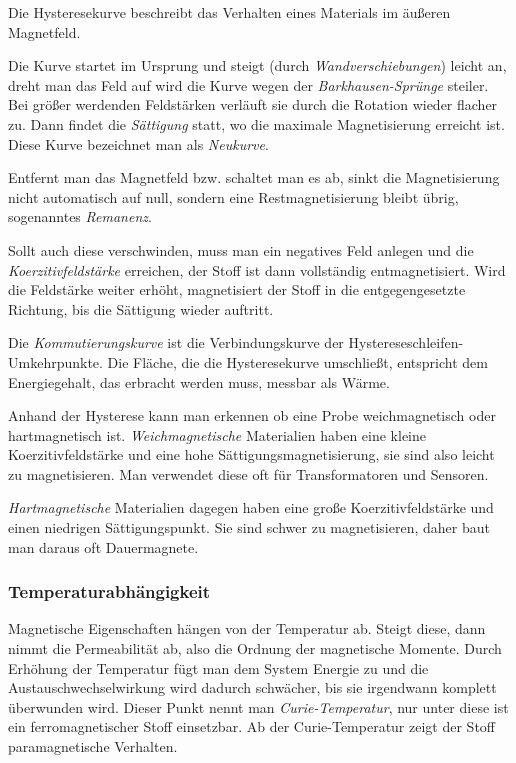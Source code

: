 \documentclass[12pt,a4paper]{scrartcl}
\numberwithin{equation}{section} %
\renewcommand{\[}{} %
\renewcommand{\]}{\noindent} %
\begin{document}
Die Hysteresekurve beschreibt das Verhalten eines Materials im äußeren
Magnetfeld.

Die Kurve startet im Ursprung und steigt (durch
\emph{Wandverschiebungen}) leicht an, dreht man das Feld auf wird die
Kurve wegen der \emph{Barkhausen-Sprünge} steiler. Bei größer werdenden
Feldstärken verläuft sie durch die Rotation wieder flacher zu. Dann
findet die \emph{Sättigung} statt, wo die maximale Magnetisierung
erreicht ist. Diese Kurve bezeichnet man als \emph{Neukurve}.

Entfernt man das Magnetfeld bzw. schaltet man es ab, sinkt die
Magnetisierung nicht automatisch auf null, sondern eine
Restmagnetisierung bleibt übrig, sogenanntes \emph{Remanenz}.

Sollt auch diese verschwinden, muss man ein negatives Feld anlegen und
die \emph{Koerzitivfeldstärke} erreichen, der Stoff ist dann vollständig
entmagnetisiert. Wird die Feldstärke weiter erhöht, magnetisiert der
Stoff in die entgegengesetzte Richtung, bis die Sättigung wieder
auftritt.

Die \emph{Kommutierungskurve} ist die Verbindungskurve der
Hystereseschleifen-Umkehrpunkte. Die Fläche, die die Hysteresekurve
umschließt, entspricht dem Energiegehalt, das erbracht werden muss,
messbar als Wärme.

Anhand der Hysterese kann man erkennen ob eine Probe weichmagnetisch
oder hartmagnetisch ist. \emph{Weichmagnetische} Materialien haben eine
kleine Koerzitivfeldstärke und eine hohe Sättigungsmagnetisierung, sie
sind also leicht zu magnetisieren. Man verwendet diese oft für
Transformatoren und Sensoren.

\emph{Hartmagnetische} Materialien dagegen haben eine große
Koerzitivfeldstärke und einen niedrigen Sättigungspunkt. Sie sind schwer
zu magnetisieren, daher baut man daraus oft Dauermagnete.

\hypertarget{temperaturabhuxe4ngigkeit}{%
\subsubsection{Temperaturabhängigkeit}\label{temperaturabhuxe4ngigkeit}}

Magnetische Eigenschaften hängen von der Temperatur ab. Steigt diese,
dann nimmt die Permeabilität ab, also die Ordnung der magnetische
Momente. Durch Erhöhung der Temperatur fügt man dem System Energie zu
und die Austauschwechselwirkung wird dadurch schwächer, bis sie
irgendwann komplett überwunden wird. Dieser Punkt nennt man
\emph{Curie-Temperatur}, nur unter diese ist ein ferromagnetischer Stoff
einsetzbar. Ab der Curie-Temperatur zeigt der Stoff paramagnetische
Verhalten.
\end{document}
